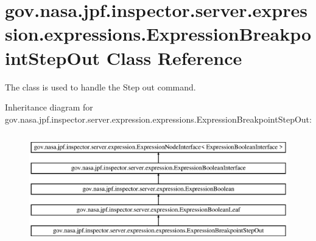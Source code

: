 \hypertarget{classgov_1_1nasa_1_1jpf_1_1inspector_1_1server_1_1expression_1_1expressions_1_1_expression_breakpoint_step_out}{}\section{gov.\+nasa.\+jpf.\+inspector.\+server.\+expression.\+expressions.\+Expression\+Breakpoint\+Step\+Out Class Reference}
\label{classgov_1_1nasa_1_1jpf_1_1inspector_1_1server_1_1expression_1_1expressions_1_1_expression_breakpoint_step_out}


The class is used to handle the Step out command.  


Inheritance diagram for gov.\+nasa.\+jpf.\+inspector.\+server.\+expression.\+expressions.\+Expression\+Breakpoint\+Step\+Out\+:\begin{figure}[H]
\begin{center}
\leavevmode
\includegraphics[height=4.827586cm]{classgov_1_1nasa_1_1jpf_1_1inspector_1_1server_1_1expression_1_1expressions_1_1_expression_breakpoint_step_out}
\end{center}
\end{figure}
